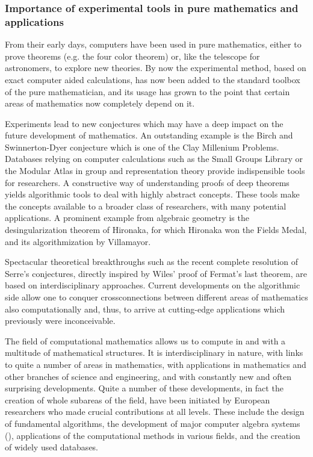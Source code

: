 \clearpage

\subsubsection{Importance of experimental tools in pure mathematics
  and applications}

From their early days, computers have been used in pure mathematics,
either to prove theorems (e.g. the four color theorem) or, like the
telescope for astronomers, to explore new theories. By now the
experimental method, based on exact computer aided calculations, has
now been added to the standard toolbox of the pure mathematician, and
its usage has grown to the point that certain areas of mathematics now
completely depend on it.

Experiments lead to new conjectures which may have a deep impact on
the future development of mathematics. An outstanding example is the
Birch and Swinnerton-Dyer conjecture which is one of the Clay
Millenium Problems.  Databases relying on computer calculations such
as the Small Groups Library or the Modular Atlas in group and
representation theory provide indispensible tools for researchers. A
constructive way of understanding proofs of deep theorems yields
algorithmic tools to deal with highly abstract concepts. These tools
make the concepts available to a broader class of researchers, with
many potential applications. A prominent example from algebraic
geometry is the desingularization theorem of Hironaka, for which
Hironaka won the Fields Medal, and its algorithmization by Villamayor.

Spectacular theoretical breakthroughs such as the recent complete
resolution of Serre's conjectures, directly inspired by Wiles' proof
of Fermat's last theorem, are based on interdisciplinary approaches.
Current developments on the algorithmic side allow one to conquer
crossconnections between different areas of mathematics also
computationally and, thus, to arrive at cutting-edge applications
which previously were inconceivable.


The field of computational mathematics allows us to compute in and
with a multitude of mathematical structures. It is interdisciplinary
in nature, with links to quite a number of areas in mathematics, with
applications in mathematics and other branches of science and
engineering, and with constantly new and often surprising
developments. Quite a number of these developments, in fact the
creation of whole subareas of the field, have been initiated by
European researchers who made crucial contributions at all
levels. These include the design of fundamental algorithms, the
development of major computer algebra systems (), applications of the computational methods in
various fields, and the creation of widely used databases.


